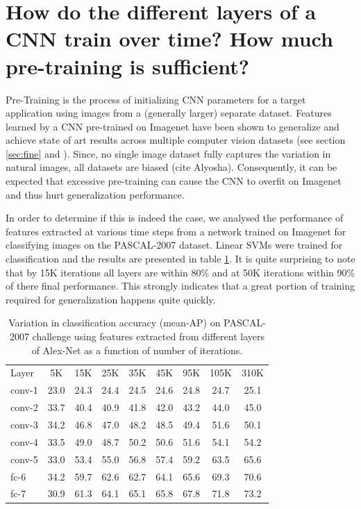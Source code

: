 \section{How do the different layers of a CNN train over time? How much pre-training is sufficient?}
\label{sec:speed}
Pre-Training is the process of initializing CNN parameters for a target application using images from a (generally larger) separate dataset. Features learned by a CNN pre-trained on Imagenet have been shown to generalize and achieve state of art results across multiple computer vision datasets (see section \ref{sec:fine} and \cite{Decaf}). Since, no single image dataset fully captures the variation in natural images, all datasets are biased (cite Alyosha). Consequently, it can be expected that excessive pre-training can cause the CNN to overfit on Imagenet and thus hurt generalization performance. 

In order to determine if this is indeed the case, we analysed the performance of features extracted  at various time steps from a network trained on Imagenet for classifying images on the PASCAL-2007 dataset. Linear SVMs were trained for classification and the results are presented in table \ref{table:det-traj-classify}. It is quite surprising to note that by 15K iterations all layers are within 80\% and at 50K iterations within 90\% of there final performance. This strongly indicates that a great portion of training required for generalization happens quite quickly. 


\setlength{\tabcolsep}{4pt}
\begin{table}[t!]
\begin{center}
\caption{Variation in classification accuracy (mean-AP) on PASCAL-2007 challenge using features extracted from different layers of Alex-Net as a function of number of iterations.}
\label{table:det-traj-classify}
\begin{tabular}{lcccccccc}
\hline\noalign{\smallskip}
Layer  & 5K & 15K & 25K & 35K & 45K & 95K & 105K & 310K \\
\noalign{\smallskip}
\hline
\noalign{\smallskip}
conv-1 & 23.0 & 24.3 & 24.4 & 24.5 & 24.6 & 24.8 & 24.7 & 25.1\\
conv-2 & 33.7 & 40.4 & 40.9 & 41.8 & 42.0 & 43.2 & 44.0 & 45.0\\
conv-3 & 34.2 & 46.8 & 47.0 & 48.2 & 48.5 & 49.4 & 51.6 & 50.1\\
conv-4 & 33.5 & 49.0 & 48.7 & 50.2 & 50.6 & 51.6 & 54.1 & 54.2\\
conv-5 & 33.0 & 53.4 & 55.0 & 56.8 & 57.4 & 59.2 & 63.5 & 65.6\\
fc-6 & 34.2 & 59.7 & 62.6 & 62.7 & 64.1 & 65.6 & 69.3 & 70.6\\
fc-7 & 30.9 & 61.3 & 64.1 & 65.1 & 65.8 & 67.8 & 71.8 & 73.2\\
\hline
\end{tabular}
\end{center}
\end{table}
\setlength{\tabcolsep}{1.4pt}

